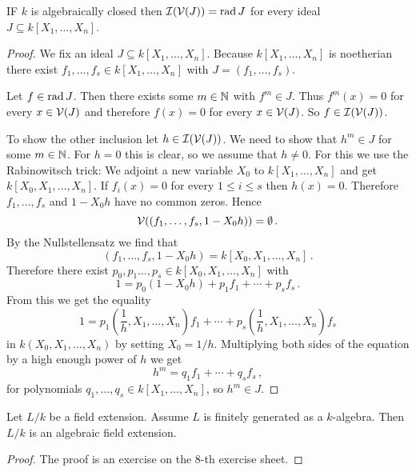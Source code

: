 \begin{cor}
  IF $k$ is algebraically closed then $\mathcal{I}(\mathcal{V}(J)) = \operatorname{rad} J$ for every ideal $J \subseteq k[X_1, \dotsc, X_n]$.
\end{cor}
\begin{proof}
  We fix an ideal $J \subseteq k[X_1, \dotsc, X_n]$.
  Because $k[X_1, \dotsc, X_n]$ is noetherian there exist $f_1, \dotsc, f_s \in k[X_1, \dotsc, X_n]$ with $J = (f_1, \dotsc, f_s)$.
  
  Let $f \in \operatorname{rad} J$.
  Then there exists some $m \in \mathbb{N}$ with $f^m \in J$.
  Thus $f^m(x) = 0$ for every $x \in \mathcal{V}(J)$ and therefore $f(x) = 0$ for every $x \in \mathcal{V}(J)$.
  So $f \in \mathcal{I}(\mathcal{V}(J))$.
  
  To show the other inclusion let $h \in \mathcal{I}(\mathcal{V}(J))$.
  We need to show that $h^m \in J$ for some $m \in \mathbb{N}$.
  For $h = 0$ this is clear, so we assume that $h \neq 0$.
  For this we use the Rabinowitsch trick:
  We adjoint a new variable $X_0$ to $k[X_1, \dotsc, X_n]$ and get $k[X_0, X_1, \dotsc, X_n]$.
  If $f_i(x) = 0$ for every $1 \leq i \leq s$ then $h(x) = 0$.
  Therefore $f_1, \dotsc, f_s$ and $1 - X_0 h$ have no common zeros.
  Hence
  \[
      \mathcal{V}((f_1, \dotsc, f_s, 1 - X_0 h))
    = \emptyset \,.
  \]
  By the Nullstellensatz we find that
  \[
      ( f_1, \dotsc, f_s, 1 - X_0 h )
    = k[X_0, X_1, \dotsc, X_n] \,.
  \]
  Therefore there exist $p_0, p_1 \ldots, p_s \in k[X_0, X_1, \dotsc, X_n]$ with
  \[
      1
    = p_0 (1 - X_0 h) + p_1 f_1 + \dotsb + p_s f_s \,.
  \]
  From this we get the equality
  \[
      1
    =   p_1 \left(\frac{1}{h}, X_1, \dotsc, X_n\right) f_1
      + \dotsb
      + p_s \left(\frac{1}{h}, X_1, \dotsc, X_n\right) f_s
  \]
  in $k(X_0, X_1, \dotsc, X_n)$ by setting $X_0 = 1 / h$.
  Multiplying both sides of the equation by a high enough power of $h$ we get
  \[
      h^m
    = q_1 f_1 + \dotsb + q_s f_s \,,
  \]
  for polynomials $q_1, \dotsc, q_s \in k[X_1, \dotsc, X_n]$, so $h^m \in J$.
\end{proof}


\begin{lem}\label{lem: finitely generated field extensions are algebraic}
  Let $L/k$ be a field extension.
  Assume $L$ is finitely generated as a $k$-algebra.
  Then $L/k$ is an algebraic field extension.
\end{lem}
\begin{proof}
  The proof is an exercise on the $8$-th exercise sheet.
\end{proof}


